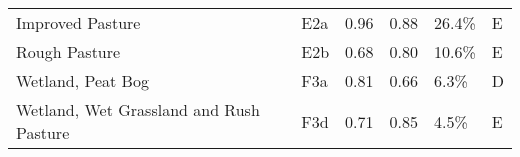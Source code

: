 \begin{tabular}{llllll}
                          Improved Pasture &           E2a &                 0.96 &               0.88 &                    26.4\% &                   E \\
                             Rough Pasture &           E2b &                 0.68 &               0.80 &                    10.6\% &                   E \\
                         Wetland, Peat Bog &           F3a &                 0.81 &               0.66 &                     6.3\% &                   D \\
   Wetland, Wet Grassland and Rush Pasture &           F3d &                 0.71 &               0.85 &                     4.5\% &                   E \\
\bottomrule
\end{tabular}
